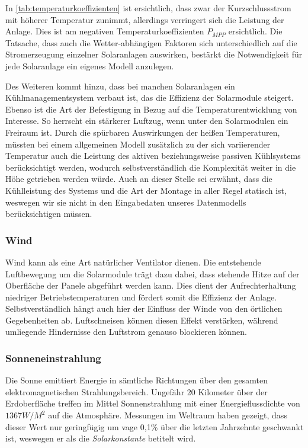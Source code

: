 \documentclass[12pt, a4paper]{article}
\begin{document}

In \autoref{tab:temperaturkoeffizienten} ist ersichtlich, dass zwar der Kurzschlussstrom mit höherer Temperatur zunimmt, allerdings verringert sich die Leistung der Anlage. Dies ist am negativen Temperaturkoeffizienten $P_{MPP}$ ersichtlich. Die Tatsache, dass auch die Wetter-abhängigen Faktoren sich unterschiedlich auf die Stromerzeugung einzelner Solaranlagen auswirken, bestärkt die Notwendigkeit für jede Solaranlage ein eigenes Modell anzulegen.

Des Weiteren kommt hinzu, dass bei manchen Solaranlagen ein Kühlmanagementsystem verbaut ist, das die Effizienz der Solarmodule steigert. Ebenso ist die Art der Befestigung in Bezug auf die Temperaturentwicklung von Interesse. So herrscht ein stärkerer Luftzug, wenn unter den Solarmodulen ein Freiraum ist. Durch die spürbaren Auswirkungen der heißen Temperaturen, müssten bei einem allgemeinen Modell zusätzlich zu der sich variierender Temperatur auch die Leistung des aktiven beziehungsweise passiven Kühlsystems berücksichtigt werden, wodurch selbstverständlich die Komplexität weiter in die Höhe getrieben werden würde. Auch an dieser Stelle sei erwähnt, dass die Kühlleistung des Systems und die Art der Montage in aller Regel statisch ist, weswegen wir sie nicht in den Eingabedaten unseres Datenmodells berücksichtigen müssen.

\subsubsection{Wind}

Wind kann als eine Art natürlicher Ventilator dienen. Die entstehende Luftbewegung um die Solarmodule trägt dazu dabei, dass stehende Hitze auf der Oberfläche der Panele abgeführt werden kann. Dies dient der Aufrechterhaltung niedriger Betriebstemperaturen und fördert somit die Effizienz der Anlage. Selbstverständlich hängt auch hier der Einfluss der Winde von den örtlichen Gegebenheiten ab. Luftschneisen können diesen Effekt verstärken, während umliegende Hindernisse den Luftstrom genauso blockieren können.

\subsubsection{Sonneneinstrahlung}

Die Sonne emittiert Energie in sämtliche Richtungen über den gesamten elektromagnetischen Strahlungsbereich. Ungefähr 20 Kilometer über der Erdoberfläche treffen im Mittel Sonnenstrahlung mit einer Energieflussdichte von $1367 W/M^2$ auf die Atmosphäre. Messungen im Weltraum haben gezeigt, dass dieser Wert nur geringfügig um vage 0,1\% über die letzten Jahrzehnte geschwankt ist, weswegen er als die \textit{Solarkonstante} betitelt wird. 
\end{document}
